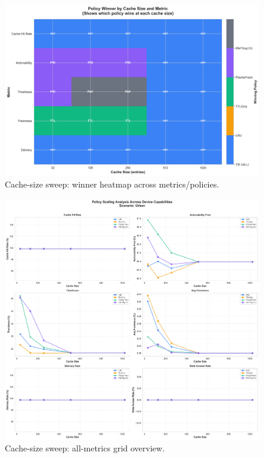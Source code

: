 \documentclass[11pt,twocolumn]{article}
\begin{document}
\begin{figure}[h]
    \centering
    \includegraphics[width=\linewidth]{figures/device_winner_heatmap.png}
    \caption{Cache-size sweep: winner heatmap across metrics/policies.}
    \label{fig:device-winner-heatmap}
\end{figure}

\begin{figure}[h]
    \centering
    \includegraphics[width=\linewidth]{figures/device_all_metrics_grid.png}
    \caption{Cache-size sweep: all-metrics grid overview.}
    \label{fig:device-all-grid}
\end{figure}
\end{document}
